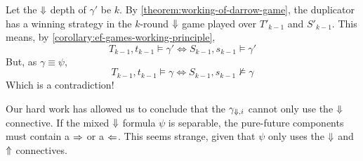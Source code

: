 \documentclass[a4paper,UKenglish,cleveref, autoref, thm-restate, numberwithinsect]{lipics-v2021}
\def\Larrow{\ensuremath\mathord{\Leftarrow}}
\def\Rarrow{\ensuremath\mathord{\Rightarrow}}
\def\Uarrow{\ensuremath\mathord{\Uparrow}}
\def\Darrow{\ensuremath\mathord{\Downarrow}}
\begin{document}
Let the $\Darrow$ depth of $\gamma'$ be $k$. By \cref{theorem:working-of-darrow-game}, the duplicator has a winning strategy in the $k$-round $\Darrow$ game played over $T'_{k - 1}$ and $S'_{k - 1}$. This means, by \cref{corollary:ef-games-working-principle},
\begin{equation*}
    T_{k-1}, t_{k-1} \vDash \gamma' \Longleftrightarrow S_{k-1}, s_{k-1} \vDash \gamma'
\end{equation*}
But, as $\gamma \equiv \psi$,
\begin{equation*}
    T_{k-1}, t_{k-1} \vDash \gamma \Longleftrightarrow S_{k-1}, s_{k-1} \nvDash \gamma
\end{equation*}
Which is a contradiction!

Our hard work has allowed us to conclude that the $\gamma_{\Darrow, i}$ cannot only use the $\Darrow$ connective. If the mixed $\Darrow$ formula $\psi$ is separable, the pure-future components must contain a $\Rarrow$ or a $\Larrow$. This seems strange, given that $\psi$ only uses the $\Darrow$ and $\Uarrow$ connectives.

%








\end{document}
